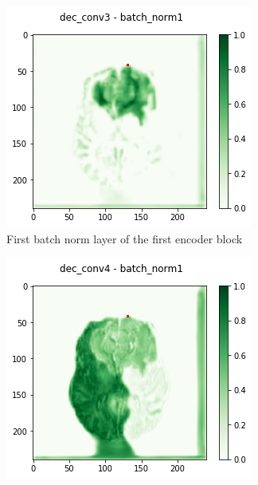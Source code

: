 \begin{figure}[H]
    \begin{subfigure}{.33\textwidth}
        \centering
        \includegraphics[width=\linewidth]{chapters/04_segmentation/images/grad_cam_30.png}
        \caption{First batch norm layer of the first encoder block}
    \end{subfigure}%
    \begin{subfigure}{.33\textwidth}
        \centering
        \includegraphics[width=\linewidth]{chapters/04_segmentation/images/grad_cam_34.png}

\end{subfigure}
\end{figure}
